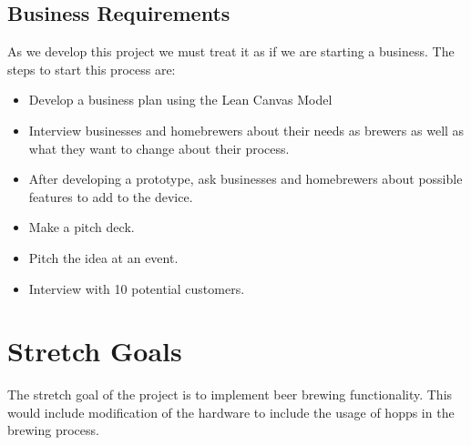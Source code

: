 \documentclass[draftclsnofoot,onecolumn,letterpaper,10pt]{IEEEtran}
\begin{document}
\subsection{Business Requirements}
As we develop this project we must treat it as if we are starting a business.
The steps to start this process are:
\begin{itemize}
	\item Develop a business plan using the Lean Canvas Model
	\item Interview businesses and homebrewers about their needs as brewers as well as what they want to change about their process.
	\item After developing a prototype, ask businesses and homebrewers about possible features to add to the device.
	\item Make a pitch deck.
	\item Pitch the idea at an event.
	\item Interview with 10 potential customers.
\end{itemize}

\section{Stretch Goals}
The stretch goal of the project is to implement beer brewing functionality.
This would include modification of the hardware to include the usage of hopps in the brewing process.
\end{document}
